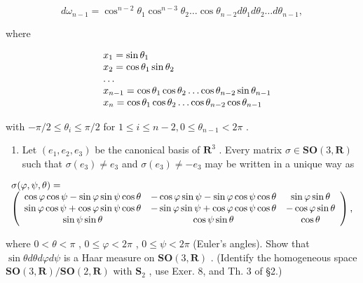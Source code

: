 \[
d \omega_ {n - 1} = \cos^ {n - 2} \theta_ {1} \cos^ {n - 3} \theta_ {2} \dots \cos \theta_ {n - 2} d \theta_ {1} d \theta_ {2} \dots d \theta_ {n - 1},
\]

where

\[
\begin{array}{r l} & x _ {1} = \sin \theta_ {1} \\ & x _ {2} = \cos \theta_ {1} \sin \theta_ {2} \\ & \dots \\ & x _ {n - 1} = \cos \theta_ {1} \cos \theta_ {2} \dots \cos \theta_ {n - 2} \sin \theta_ {n - 1} \\ & x _ {n} = \cos \theta_ {1} \cos \theta_ {2} \dots \cos \theta_ {n - 2} \cos \theta_ {n - 1} \end{array}
\]

with \(-\pi / 2 \leqslant \theta_{i} \leqslant \pi / 2\) for \(1 \leqslant i \leqslant n - 2, 0 \leqslant \theta_{n-1} < 2\pi\) .

\begin{enumerate}
\def\labelenumi{\arabic{enumi})}
\setcounter{enumi}{8}
\tightlist
\item
  Let \((e_1, e_2, e_3)\) be the canonical basis of \(\mathbf{R}^3\) . Every matrix \(\sigma \in \mathbf{SO}(3, \mathbf{R})\) such that \(\sigma(e_3) \neq e_3\) and \(\sigma(e_3) \neq -e_3\) may be written in a unique way as
\end{enumerate}

\[
\begin{array}{l} \sigma (\varphi , \psi , \theta) = \\ \left( \begin{array}{c c c} \cos \varphi   \cos \psi - \sin \varphi   \sin \psi   \cos \theta & - \cos \varphi   \sin \psi - \sin \varphi   \cos \psi   \cos \theta & \sin \varphi   \sin \theta \\ \sin \varphi   \cos \psi + \cos \varphi   \sin \psi   \cos \theta & - \sin \varphi   \sin \psi + \cos \varphi   \cos \psi   \cos \theta & - \cos \varphi   \sin \theta \\ \sin \psi   \sin \theta & \cos \psi   \sin \theta & \cos \theta \end{array} \right), \end{array}
\]

where \(0 < \theta < \pi\) , \(0 \leqslant \varphi < 2\pi\) , \(0 \leqslant \psi < 2\pi\) (Euler's angles). Show that \(\sin \theta d\theta d\varphi d\psi\) is a Haar measure on \(\mathbf{SO}(3, \mathbf{R})\) . (Identify the homogeneous space \(\mathbf{SO}(3, \mathbf{R}) / \mathbf{SO}(2, \mathbf{R})\) with \(\mathbf{S}_2\) , use Exer. 8, and Th. 3 of §2.)

